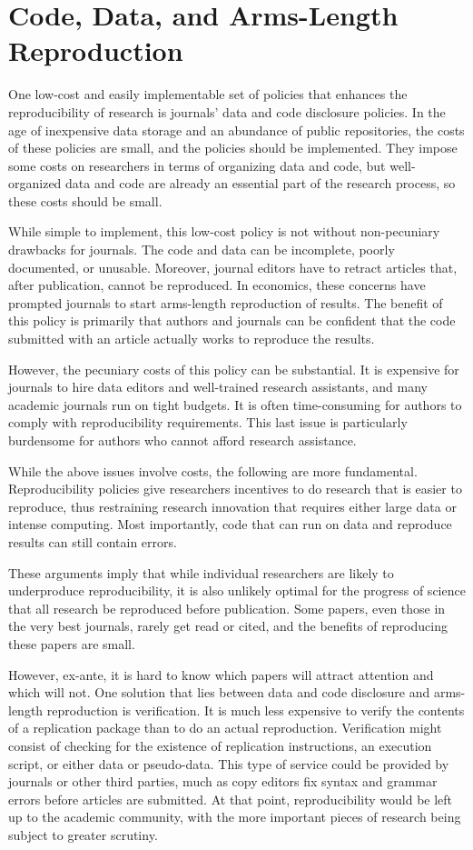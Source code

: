 \documentclass[12pt, oneside]{article}
\begin{document}
\section{Code, Data, and Arms-Length Reproduction} 

One low-cost and easily implementable set of policies that enhances the reproducibility of research is journals' data and code disclosure policies. In the age of inexpensive data storage and an abundance of public repositories, the costs of these policies are small, and the policies should be implemented.  They impose some costs on researchers in terms of organizing data and code, but well-organized data and code are already an essential part of the research process, so these costs should be small.  

While simple to implement, this low-cost policy is not without non-pecuniary drawbacks for journals.  The code and data can be incomplete, poorly documented, or unusable. Moreover, journal editors have to retract articles that, after publication, cannot be reproduced.  In economics, these concerns have prompted journals to start arms-length reproduction of results. The benefit of this policy is primarily that authors and journals can be confident that the code submitted with an article actually works to reproduce the results.  

However, the pecuniary costs of this policy can be substantial. It is expensive for journals to hire data editors and well-trained research assistants, and many academic journals run on tight budgets.  It is often time-consuming for authors to comply with reproducibility requirements. This last issue is particularly burdensome for authors who cannot afford research assistance. 

While the above issues involve costs, the following are more fundamental. Reproducibility policies give researchers incentives to do research that is easier to reproduce, thus restraining research innovation that requires either large data or intense computing.  Most importantly, code that can run on data and reproduce results can still contain errors. 

These arguments imply that while individual researchers are likely to underproduce reproducibility, it is also unlikely optimal for the progress of science that all research be reproduced before publication. Some papers, even those in the very best journals, rarely get read or cited, and the benefits of reproducing these papers are small. 

However, ex-ante, it is hard to know which papers will attract attention and which will not.  One solution that lies between data and code disclosure and arms-length reproduction is verification.  It is much less expensive to verify the contents of a replication package than to do an actual reproduction. Verification might consist of checking for the existence of replication instructions, an execution script, or either data or pseudo-data.  This type of service could be provided by journals or other third parties, much as copy editors fix syntax and grammar errors before articles are submitted. At that point, reproducibility would be left up to the academic community, with the more important pieces of research being subject to greater scrutiny. 
\end{document}
